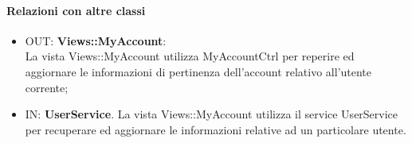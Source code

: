	\paragraph{Relazioni con altre classi}
	\begin{itemize}
	  \item OUT: \textbf{Views::MyAccount}:\\
		La vista Views::MyAccount utilizza MyAccountCtrl per reperire ed aggiornare le informazioni di pertinenza dell'account relativo all'utente corrente;	
	   \item IN: \textbf{UserService}.
	  	La vista Views::MyAccount utilizza il service UserService per recuperare ed aggiornare le informazioni relative ad un particolare utente.	
	  		
	\end{itemize}		
	
